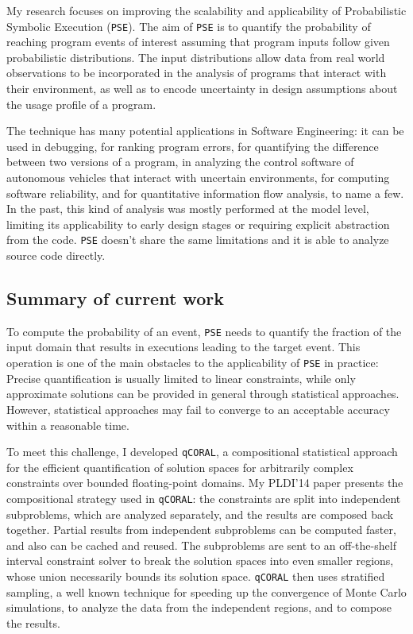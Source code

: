 \documentclass[12pt]{article}
\newcounter{list}
\begin{document}
\newcommand{\PSE}{\texttt{PSE}}
\newcommand{\qCORAL}{\texttt{qCORAL}}
\raisebox{1cm}

My research focuses on improving the scalability and applicability of
Probabilistic Symbolic Execution (\PSE{}). The aim of \PSE{}
\cite{borges2015iterative} is to quantify the probability of reaching
program events of interest assuming that program inputs follow given
probabilistic distributions. The input distributions allow data from
real world observations to be incorporated in the analysis of programs
that interact with their environment, as well as to encode uncertainty
in design assumptions about the usage profile of a program.

The technique has many potential applications in Software Engineering:
it can be used in debugging, for ranking program errors, for
quantifying the difference between two versions of a program, in
analyzing the control software of autonomous vehicles that interact
with uncertain environments, for computing software reliability, and
for quantitative information flow analysis, to name a few. In the
past, this kind of analysis was mostly performed at the model level,
limiting its applicability to early design stages or requiring
explicit abstraction from the code. \PSE{} doesn't share the same
limitations and it is able to analyze source code directly.

\subsection*{Summary of current work}

To compute the probability of an event, \PSE{} needs to quantify the
fraction of the input domain that results in executions leading to the
target event. This operation is one of the main obstacles to the
applicability of \PSE{} in practice: Precise quantification is usually
limited to linear constraints, while only approximate solutions can be
provided in general through statistical approaches. However,
statistical approaches may fail to converge to an acceptable accuracy
within a reasonable time.

To meet this challenge, I developed
\qCORAL\cite{borges2014compositional}, a compositional statistical
approach for the efficient quantification of solution spaces for
arbitrarily complex constraints over bounded floating-point
domains. My PLDI'14 paper presents the compositional strategy used in
\qCORAL: the constraints are split into independent subproblems, which
are analyzed separately, and the results are composed back
together. Partial results from independent subproblems can be computed
faster, and also can be cached and reused. The subproblems are sent to
an off-the-shelf interval constraint solver to break the solution
spaces into even smaller regions, whose union necessarily bounds its
solution space.  \qCORAL{} then uses stratified sampling, a well known
technique for speeding up the convergence of Monte Carlo simulations,
to analyze the data from the independent regions, and to compose the
results.
\end{document}
